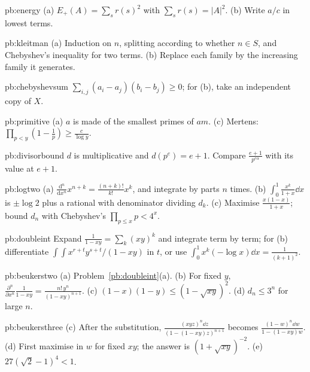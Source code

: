 \begin{hint}{pb:energy}
(a) $E_+(A)=\sum_sr(s)^2$ with $\sum_sr(s)=|A|^2$. (b) Write $a/c$ in lowest terms.
\end{hint}

\begin{hint}{pb:kleitman}
(a) Induction on $n$, splitting according to whether $n\in S$, and Chebyshev's inequality for two terms. (b) Replace each family by
the increasing family it generates.
\end{hint}

\begin{hint}{pb:chebyshevsum}
$\sum_{i,j}(a_i-a_j)(b_i-b_j)\ge0$; for (b), take an independent copy of $X$.
\end{hint}

\begin{hint}{pb:primitive}
(a) $a$ is made of the smallest primes of $am$. (c) Mertens: $\prod_{p<y}(1-\frac1p)\ge\frac c{\log y}$.
\end{hint}

\begin{hint}{pb:divisorbound}
$d$ is multiplicative and $d(p^e)=e+1$. Compare $\frac{e+1}{p^{e\alpha}}$ with its value at $e+1$.
\end{hint}

\begin{hint}{pb:logtwo}
(a) $\frac{\mathrm d^n}{\mathrm dx^n}x^{n+k}=\frac{(n+k)!}{k!}x^k$, and integrate by parts $n$ times. (b) $\int_0^1\frac{x^k}{1+x}\dd x$ is $\pm\log2$ plus a rational with
denominator dividing $d_k$. (c) Maximise $\frac{x(1-x)}{1+x}$; bound $d_n$ with Chebyshev's $\prod_{p\le x}p<4^x$.
\end{hint}

\begin{hint}{pb:doubleint}
Expand $\frac1{1-xy}=\sum_k(xy)^k$ and integrate term by term; for (b) differentiate $\int\!\!\int x^{r+t}y^{s+t}/(1-xy)$ in $t$, or use
$\int_0^1x^k(-\log x)\dd x=\frac1{(k+1)^2}$.
\end{hint}

\begin{hint}{pb:beukerstwo}
(a) Problem~\ref{pb:doubleint}(a). (b) For fixed $y$, $\frac{\partial^n}{\partial x^n}\frac1{1-xy}=\frac{n!\,y^n}{(1-xy)^{n+1}}$. (c) $(1-x)(1-y)\le(1-\sqrt{xy})^2$.
(d) $d_n\le3^n$ for large $n$.
\end{hint}

\begin{hint}{pb:beukersthree}
(c) After the substitution, $\frac{(xyz)^n\dd z}{(1-(1-xy)z)^{n+1}}$ becomes $\frac{(1-w)^n\dd w}{1-(1-xy)w}$. (d) First maximise in $w$ for fixed $xy$; the
answer is $(1+\sqrt{xy})^{-2}$. (e) $27(\sqrt2-1)^4<1$.
\end{hint}

